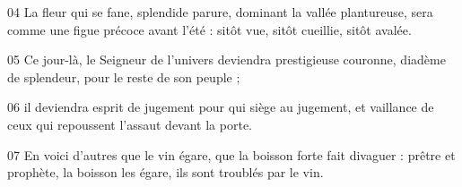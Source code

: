 
04 La fleur qui se fane, splendide parure, dominant la vallée plantureuse, sera comme une figue précoce avant l’été : sitôt vue, sitôt cueillie, sitôt avalée.

05 Ce jour-là, le Seigneur de l’univers deviendra prestigieuse couronne, diadème de splendeur, pour le reste de son peuple ;

06 il deviendra esprit de jugement pour qui siège au jugement, et vaillance de ceux qui repoussent l’assaut devant la porte.

07 En voici d’autres que le vin égare, que la boisson forte fait divaguer : prêtre et prophète, la boisson les égare, ils sont troublés par le vin.
